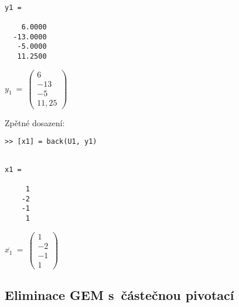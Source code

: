 \documentclass[a4paper,10pt]{article}
\begin{document}
\begin{minipage}[t]{.5\textwidth}
\begin{verbatim}

y1 =

    6.0000
  -13.0000
   -5.0000
   11.2500

\end{verbatim}
\end{minipage}%
\begin{minipage}[t]{.5\textwidth}

\bigskip
\bigskip

$
y_1~=~
\left( \begin{array}{r}
  6 \\
-13 \\
 -5 \\
 11,25
\end{array} \right)
$
\vfill
\end{minipage}


\par Zpětné dosazení:

\begin{verbatim}
>> [x1] = back(U1, y1)
\end{verbatim}

\begin{minipage}[t]{.5\textwidth}
\begin{verbatim}

x1 =

     1
    -2
    -1
     1

\end{verbatim}
\end{minipage}%
\begin{minipage}[t]{.5\textwidth}

\bigskip
\bigskip

$
\overline{x_1}~=~
\left( \begin{array}{r}
  1 \\
 -2 \\
 -1 \\
  1
\end{array} \right)
$
\vfill
\end{minipage}



\subsection{Eliminace GEM s~částečnou pivotací}
\end{document}
